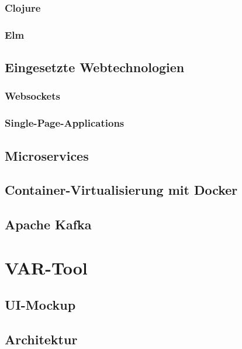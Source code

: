 \documentclass[10pt,a4paper]{report}
\begin{document}
  \subsection{Clojure}
  \subsection{Elm}
  \section{Eingesetzte Webtechnologien}
  \subsection{Websockets}
  \subsection{Single-Page-Applications}
  \section{Microservices}
  \section{Container-Virtualisierung mit Docker}
  \section{Apache Kafka}

  \chapter{VAR-Tool}
  \section{UI-Mockup}
  \section{Architektur}
\end{document}
